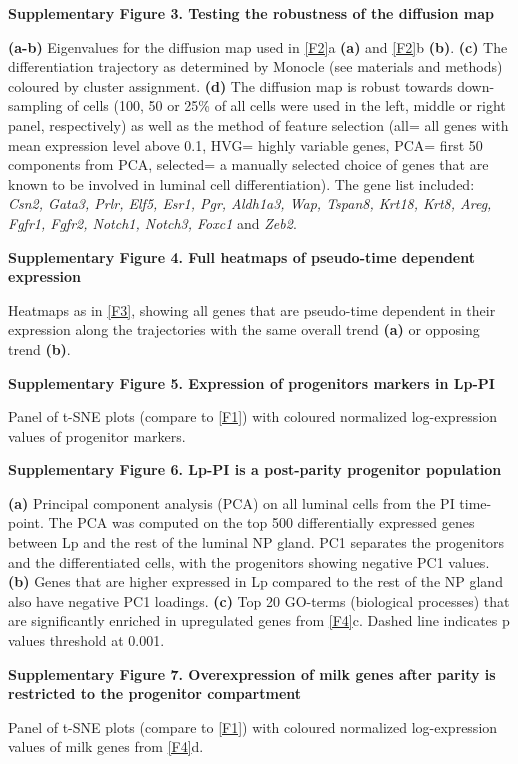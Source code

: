 \documentclass[titlepage, 12pt, oneside]{amsart}
\begin{document}
\textbf{Supplementary Figure 3. Testing the robustness of the diffusion
map}

\textbf{(a-b)} Eigenvalues for the diffusion map used in \autoref{F2}a
\textbf{(a)} and \autoref{F2}b \textbf{(b)}. 
\textbf{(c)} The differentiation trajectory as determined by Monocle (see materials and methods) coloured by cluster assignment.
\textbf{(d)} The diffusion map is robust towards down-sampling of cells (100, 50 or 25\% of all cells were used in the left, middle or right panel, respectively) as well as the method of feature selection (all= all genes with mean expression level above 0.1, HVG= highly variable genes, PCA= first 50 components from PCA, selected= a manually selected choice of genes that are known to be involved in luminal cell differentiation).
The gene list included: \textit{Csn2, Gata3, Prlr, Elf5, Esr1, Pgr, Aldh1a3, Wap, Tspan8, Krt18, Krt8, Areg, Fgfr1, Fgfr2, Notch1, Notch3, Foxc1} and \textit{Zeb2}.

\textbf{Supplementary Figure 4. Full heatmaps of pseudo-time dependent
expression}

Heatmaps as in \autoref{F3}, showing all genes that are pseudo-time dependent in their expression along the trajectories with the same overall trend \textbf{(a)} or opposing trend \textbf{(b)}.

\textbf{Supplementary Figure 5. Expression of progenitors markers in Lp-PI}

Panel of t-SNE plots (compare to \autoref{F1}) with coloured normalized log-expression values of progenitor markers.

\textbf{Supplementary Figure 6. Lp-PI is a post-parity progenitor
population }

\textbf{(a)} Principal component analysis (PCA) on all luminal cells from the PI time-point.
The PCA was computed on the top 500 differentially expressed genes between Lp and the rest of the luminal NP gland.
PC1 separates the progenitors and the differentiated cells, with the progenitors showing negative PC1 values.
\textbf{(b)} Genes that are higher expressed in Lp compared to the rest of the NP gland also have negative PC1 loadings.
\textbf{(c)} Top 20 GO-terms (biological processes) that are significantly enriched in upregulated genes from \autoref{F4}c.
Dashed line indicates p values threshold at 0.001.

\textbf{Supplementary Figure 7. Overexpression of milk genes after
parity is restricted to the progenitor compartment}

Panel of t-SNE plots (compare to \autoref{F1}) with coloured normalized log-expression values of milk genes from \autoref{F4}d.
\end{document}
